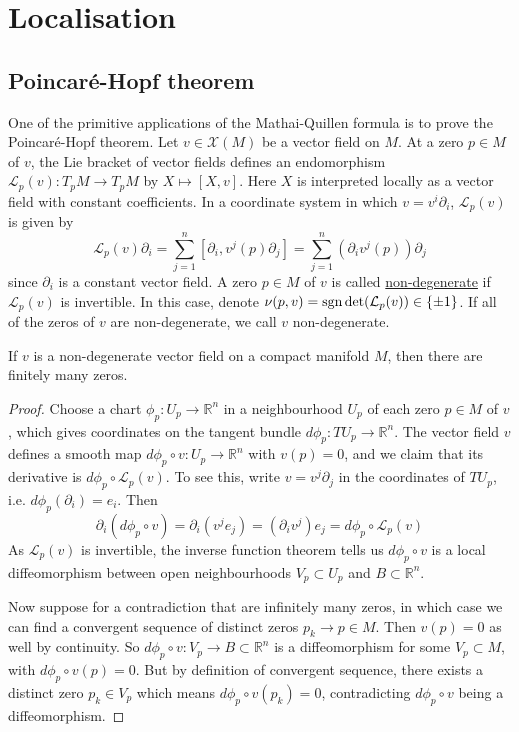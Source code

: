 \chapter{Localisation}
\section{Poincar\'e-Hopf theorem}
One of the primitive applications of the Mathai-Quillen formula is to prove the
Poincar\'e-Hopf theorem. 
Let $v\in\mathcal{X}(M)$ be a vector field on $M$.
At a zero $p\in M$ of  $v$, the Lie bracket of vector fields defines an endomorphism 
$\mathcal{L}_p(v) : T_pM \to T_pM$ by  $X\mapsto [X,v]$. Here $X$ is 
interpreted locally as a vector field with constant coefficients. 
In a coordinate system in
which $v= v^i \partial_i$, $\mathcal{L}_p(v)$ is given by 
 \[
	 \mathcal{L}_p(v)\partial_i = \sum_{j=1}^{n} [\partial_i, v^j(p)\partial_j] 
	 = \sum_{j=1}^{n} (\partial_i v^j(p)) \partial_j
\] 
since $\partial_i$ is a constant vector field. 
A zero $p\in M$ of $v$ is called \underline{non-degenerate} if  $\mathcal{L}_p(v)$ is
invertible. In this case, denote $\nu(p,v) = \operatorname{sgn} \det(\mathcal{L}_p(v)) 
\in \{\pm 1\}$. If all of the zeros of $v$ are non-degenerate, we call  $v$
non-degenerate. 

\begin{lem}
If $v$ is a non-degenerate vector field on a compact manifold  $M$, then there
are finitely many zeros. 
\end{lem}
\begin{proof}
	Choose a chart $\phi_p : U_p \to \mathbb{R}^n$ in a neighbourhood $U_p$ of
	each zero $p\in M$ of $v$, which gives coordinates on the tangent bundle 
	$d\phi_p : TU_p \to \mathbb{R}^n$. The vector field $v$ defines a
	smooth map $d\phi_p \circ v : U_p\to \mathbb{R}^n$ 
	with $v(p) = 0$, and we claim that its derivative is $d\phi_p\circ \mathcal{L}_p(v)$. 
	To see this, write $v = v^j\partial_j$ in the coordinates of $TU_p$, i.e.
	$d\phi_p(\partial_i) = e_i$. Then 
	\[
	\partial_i(d\phi_p \circ v)
	= \partial_i( v^j e_j)
	= (\partial_i v^j) e_j
	= d\phi_p\circ \mathcal{L}_p(v)
	\] 
	As $\mathcal{L}_p(v)$ is invertible, the inverse function theorem tells us 
	$d\phi_p \circ v$ is a local diffeomorphism
	between open neighbourhoods $V_p \subset U_p$ and $B \subset \mathbb{R}^n$. 

	Now suppose for a contradiction that are infinitely many zeros, in which
	case we can find a convergent sequence of distinct zeros $p_k \to p \in M$. Then
	$v(p)=0$ as well by continuity. So $d\phi_p\circ v : V_p \to B \subset
	\mathbb{R}^n$ is a diffeomorphism for some $V_p \subset M$, with 
	$d\phi_p\circ v(p) = 0$. But by definition of convergent sequence, there
	exists a distinct zero $p_k \in V_p$ which means $d\phi_p\circ v(p_k) = 0$,
	contradicting  $d\phi_p\circ v$ being a diffeomorphism.
\end{proof}

